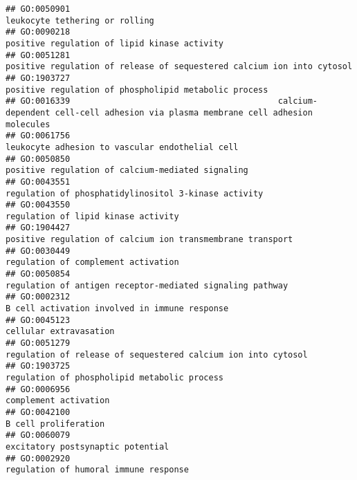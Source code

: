 \documentclass[
]{article}
\begin{document}
\begin{verbatim}
## GO:0050901                                                                                            leukocyte tethering or rolling
## GO:0090218                                                                              positive regulation of lipid kinase activity
## GO:0051281                                                    positive regulation of release of sequestered calcium ion into cytosol
## GO:1903727                                                                     positive regulation of phospholipid metabolic process
## GO:0016339                                          calcium-dependent cell-cell adhesion via plasma membrane cell adhesion molecules
## GO:0061756                                                                           leukocyte adhesion to vascular endothelial cell
## GO:0050850                                                                         positive regulation of calcium-mediated signaling
## GO:0043551                                                                      regulation of phosphatidylinositol 3-kinase activity
## GO:0043550                                                                                       regulation of lipid kinase activity
## GO:1904427                                                                positive regulation of calcium ion transmembrane transport
## GO:0030449                                                                                       regulation of complement activation
## GO:0050854                                                                 regulation of antigen receptor-mediated signaling pathway
## GO:0002312                                                                             B cell activation involved in immune response
## GO:0045123                                                                                                    cellular extravasation
## GO:0051279                                                             regulation of release of sequestered calcium ion into cytosol
## GO:1903725                                                                              regulation of phospholipid metabolic process
## GO:0006956                                                                                                     complement activation
## GO:0042100                                                                                                      B cell proliferation
## GO:0060079                                                                                         excitatory postsynaptic potential
## GO:0002920                                                                                     regulation of humoral immune response

\end{verbatim}
\end{document}

